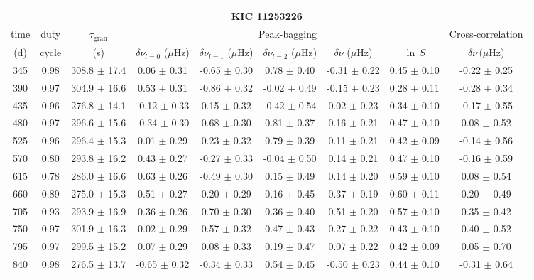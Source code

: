 \documentclass[twocolumn]{aastex61}%
\begin{document}
\begin{table*}[ht]\centering\fontsize{9.}{7.}\selectfont
\begin{tabular}{ccc|ccccc|c}
\multicolumn{9}{c}{KIC 11253226}\\ \hline\hline
time & duty & $\tau_\text{gran}$ &\multicolumn{5}{c|}{Peak-bagging}&Cross-correlation\\
(d)& cycle & (s)&$\delta\nu_{l=0}$ ($\mu$Hz) & $\delta\nu_{l=1}$ ($\mu$Hz) & $\delta\nu_{l=2}$ ($\mu$Hz) & $\delta\nu$ ($\mu$Hz)& $\ln\,S$ & $\delta\nu\,(\mu$Hz)\\\hline
345 & 0.98 & 308.8 $\pm$ 17.4 & 0.06 $\pm$ 0.31 & -0.65 $\pm$ 0.30 & 0.78 $\pm$ 0.40 & -0.31 $\pm$ 0.22 & 0.45 $\pm$ 0.10 & -0.22 $\pm$ 0.25\\
390 & 0.97 & 304.9 $\pm$ 16.6 & 0.53 $\pm$ 0.31 & -0.86 $\pm$ 0.32 & -0.02 $\pm$ 0.49 & -0.15 $\pm$ 0.23 & 0.28 $\pm$ 0.11 & -0.28 $\pm$ 0.34\\
435 & 0.96 & 276.8 $\pm$ 14.1 & -0.12 $\pm$ 0.33 & 0.15 $\pm$ 0.32 & -0.42 $\pm$ 0.54 & 0.02 $\pm$ 0.23 & 0.34 $\pm$ 0.10 & -0.17 $\pm$ 0.55\\
480 & 0.97 & 296.6 $\pm$ 15.6 & -0.34 $\pm$ 0.30 & 0.68 $\pm$ 0.30 & 0.81 $\pm$ 0.37 & 0.16 $\pm$ 0.21 & 0.47 $\pm$ 0.10 & 0.08 $\pm$ 0.52\\
525 & 0.96 & 296.4 $\pm$ 15.3 & 0.01 $\pm$ 0.29 & 0.23 $\pm$ 0.32 & 0.79 $\pm$ 0.39 & 0.11 $\pm$ 0.21 & 0.42 $\pm$ 0.09 & -0.14 $\pm$ 0.56\\
570 & 0.80 & 293.8 $\pm$ 16.2 & 0.43 $\pm$ 0.27 & -0.27 $\pm$ 0.33 & -0.04 $\pm$ 0.50 & 0.14 $\pm$ 0.21 & 0.47 $\pm$ 0.10 & -0.16 $\pm$ 0.59\\
615 & 0.78 & 286.0 $\pm$ 16.6 & 0.63 $\pm$ 0.26 & -0.49 $\pm$ 0.30 & 0.15 $\pm$ 0.49 & 0.14 $\pm$ 0.20 & 0.59 $\pm$ 0.10 & 0.08 $\pm$ 0.54\\
660 & 0.89 & 275.0 $\pm$ 15.3 & 0.51 $\pm$ 0.27 & 0.20 $\pm$ 0.29 & 0.16 $\pm$ 0.45 & 0.37 $\pm$ 0.19 & 0.60 $\pm$ 0.11 & 0.20 $\pm$ 0.49\\
705 & 0.93 & 293.9 $\pm$ 16.9 & 0.36 $\pm$ 0.26 & 0.70 $\pm$ 0.30 & 0.36 $\pm$ 0.40 & 0.51 $\pm$ 0.20 & 0.57 $\pm$ 0.10 & 0.35 $\pm$ 0.42\\
750 & 0.97 & 301.9 $\pm$ 16.3 & 0.02 $\pm$ 0.29 & 0.57 $\pm$ 0.32 & 0.47 $\pm$ 0.43 & 0.27 $\pm$ 0.22 & 0.43 $\pm$ 0.10 & 0.40 $\pm$ 0.52\\
795 & 0.97 & 299.5 $\pm$ 15.2 & 0.07 $\pm$ 0.29 & 0.08 $\pm$ 0.33 & 0.19 $\pm$ 0.47 & 0.07 $\pm$ 0.22 & 0.42 $\pm$ 0.09 & 0.05 $\pm$ 0.70\\
840 & 0.98 & 276.5 $\pm$ 13.7 & -0.65 $\pm$ 0.32 & -0.34 $\pm$ 0.33 & 0.54 $\pm$ 0.45 & -0.50 $\pm$ 0.23 & 0.44 $\pm$ 0.10 & -0.31 $\pm$ 0.64\\

\end{tabular}
\end{table*}
\end{document}
